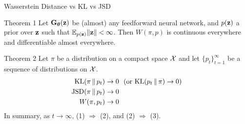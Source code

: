 \documentclass{beamer}
\begin{document}
\begin{frame}{Wasserstein Distance vs KL vs JSD}
	\begin{block}{Theorem 1}
		Let $\mathbf{G}_{\boldsymbol{\theta}}(\mathbf{z})$ be (almost) any feedforward neural network, and $p(\mathbf{z})$ a prior over $\mathbf{z}$ such that $\mathbb{E}_{p(\mathbf{z})} \|\mathbf{z}\| < \infty$. Then $W(\pi, p)$ is continuous everywhere and differentiable almost everywhere.
	\end{block}
	\begin{block}{Theorem 2}
		Let $\pi$ be a distribution on a compact space $\mathcal{X}$ and let $\{p_t\}_{t=1}^\infty$ be a sequence of distributions on $\mathcal{X}$. 
		\begin{align}
			\mathrm{KL}(\pi\,\|\,p_t) &\rightarrow 0 \ \ (\text{or }\mathrm{KL} (p_t\,\|\,\pi) \rightarrow 0) \\
			\mathrm{JSD}(\pi\,\|\,p_t) &\rightarrow 0 \\
			W(\pi, p_t) &\rightarrow 0
		\end{align}
		In summary, as $t \rightarrow \infty$, (1) $\Rightarrow$ (2), and (2) $\Rightarrow$ (3).
	\end{block}
\end{frame}
\end{document}
